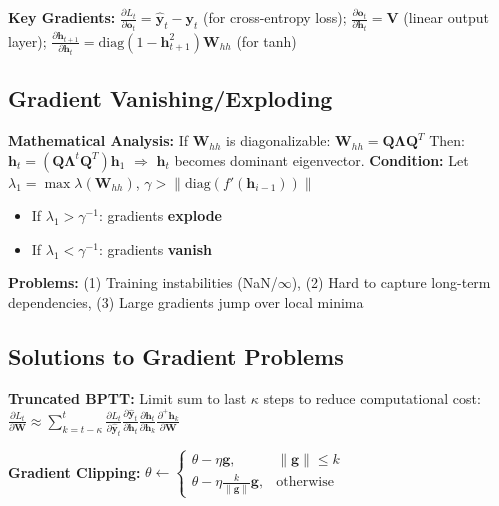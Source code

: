 \textbf{Key Gradients:} $\frac{\partial L_t}{\partial \mathbf{o}_t} = \hat{\mathbf{y}}_t - \mathbf{y}_t$ (for cross-entropy loss); $\frac{\partial \mathbf{o}_t}{\partial \mathbf{h}_t} = \mathbf{V}$ (linear output layer); $\frac{\partial \mathbf{h}_{t+1}}{\partial \mathbf{h}_t} = \text{diag}(1 - \mathbf{h}_{t+1}^2) \mathbf{W}_{hh}$ (for tanh)

\subsection{Gradient Vanishing/Exploding}

\textbf{Mathematical Analysis:} If $\mathbf{W}_{hh}$ is diagonalizable: $\mathbf{W}_{hh} = \mathbf{Q} \boldsymbol{\Lambda} \mathbf{Q}^T$
Then: $\mathbf{h}_t = (\mathbf{Q} \boldsymbol{\Lambda}^t \mathbf{Q}^T) \mathbf{h}_1$ $\Rightarrow$ $\mathbf{h}_t$ becomes dominant eigenvector. 
\textbf{Condition:} Let $\lambda_1 = \max \lambda(\mathbf{W}_{hh})$, $\gamma > \|\text{diag}(f'(\mathbf{h}_{i-1}))\|$
\begin{itemize}
    \item If $\lambda_1 > \gamma^{-1}$: gradients \textbf{explode}
    \item If $\lambda_1 < \gamma^{-1}$: gradients \textbf{vanish}
\end{itemize}

\textbf{Problems:} (1) Training instabilities (NaN/$\infty$), (2) Hard to capture long-term dependencies, (3) Large gradients jump over local minima

\subsection{Solutions to Gradient Problems}

\textbf{Truncated BPTT:} Limit sum to last $\kappa$ steps to reduce computational cost: {\footnotesize $\frac{\partial L_t}{\partial \mathbf{W}} \approx \sum_{k=t-\kappa}^t \frac{\partial L_t}{\partial \hat{\mathbf{y}}_t} \frac{\partial \hat{\mathbf{y}}_t}{\partial \mathbf{h}_t} \frac{\partial \mathbf{h}_t}{\partial \mathbf{h}_k} \frac{\partial^+ \mathbf{h}_k}{\partial \mathbf{W}}$}

\textbf{Gradient Clipping:} 
{
\footnotesize
$\theta \leftarrow 
\begin{cases}
\theta - \eta \mathbf{g}, & \|\mathbf{g}\| \leq k \\
\theta - \eta \frac{k}{\|\mathbf{g}\|} \mathbf{g}, & \text{otherwise}
\end{cases}$
}

